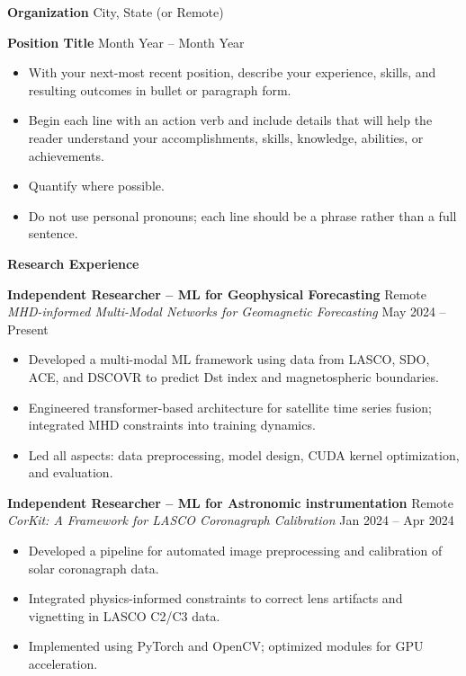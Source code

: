 \documentclass[11pt]{article}
\begin{document}
\vspace{12pt}

\textbf{Organization} \hfill City, State (or Remote)

\textbf{Position Title} \hfill Month Year – Month Year
\begin{itemize}[noitemsep, topsep=0pt, partopsep=0pt, parsep=0pt]
    \item With your next-most recent position, describe your experience, skills, and resulting outcomes in bullet or paragraph form.
    \item Begin each line with an action verb and include details that will help the reader understand your accomplishments, skills, knowledge, abilities, or achievements.
    \item Quantify where possible.
    \item Do not use personal pronouns; each line should be a phrase rather than a full sentence.
\end{itemize}
\begin{center}
    \textbf{Research Experience}
\end{center}

\textbf{Independent Researcher – ML for Geophysical Forecasting} \hfill Remote \\
\textit{MHD-informed Multi-Modal Networks for Geomagnetic Forecasting} \hfill May 2024 – Present
\begin{itemize}[noitemsep]
    \item Developed a multi-modal ML framework using data from LASCO, SDO, ACE, and DSCOVR to predict Dst index and magnetospheric boundaries.
    \item Engineered transformer-based architecture for satellite time series fusion; integrated MHD constraints into training dynamics.
    \item Led all aspects: data preprocessing, model design, CUDA kernel optimization, and evaluation.
\end{itemize}

\textbf{Independent Researcher – ML for Astronomic instrumentation} \hfill Remote \\
\textit{CorKit: A Framework for LASCO Coronagraph Calibration} \hfill Jan 2024 – Apr 2024
\begin{itemize}[noitemsep]
    \item Developed a pipeline for automated image preprocessing and calibration of solar coronagraph data.
    \item Integrated physics-informed constraints to correct lens artifacts and vignetting in LASCO C2/C3 data.
    \item Implemented using PyTorch and OpenCV; optimized modules for GPU acceleration.
\end{itemize}
\end{document}
